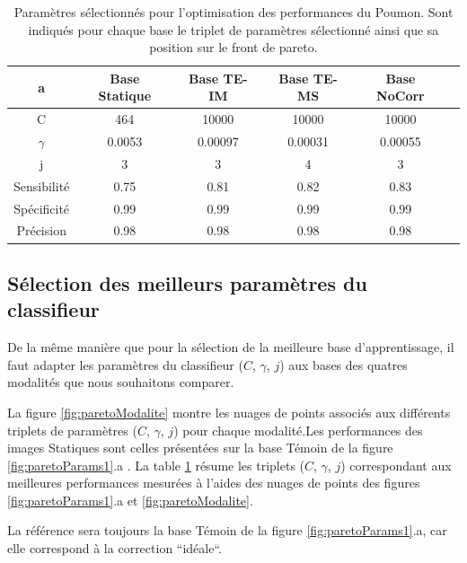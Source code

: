 \begin{table}[h!]
	\begin{center}
		\begin{tabular}{c| c c c c c}
  \hline
  a	& Base Statique	& Base TE-IM	& Base TE-MS	& Base NoCorr	\\
  \hline
 C 	& 464		& 10000		& 10000		& 10000		\\
\hline
$\gamma$& 0.0053	& 0.00097	& 0.00031	& 0.00055	\\
\hline
j	& 3		& 3		& 4		& 3		\\
\hline
\hline
Sensibilité& 0.75	& 0.81		& 0.82		& 0.83	\\
\hline
Spécificité& 0.99	& 0.99		& 0.99		& 0.99		\\
\hline
Précision& 0.98		& 0.98		& 0.98		& 0.98		\\
\hline
 		\end{tabular}

	\end{center}
\caption{Paramètres sélectionnés pour l'optimisation des performances du Poumon. Sont indiqués pour chaque base le triplet de paramètres sélectionné ainsi que sa position sur le front de pareto.}
\label{tab:paramsModPoumon}
\end{table}

\subsection{Sélection des meilleurs paramètres du classifieur}

De la même manière que pour la sélection de la meilleure base d'apprentissage, il faut adapter les paramètres du classifieur ($C$, $\gamma$, $j$) aux bases des quatres modalités que nous souhaitons comparer.

La figure \ref{fig:paretoModalite} montre les nuages de points associés aux différents triplets de paramètres ($C$, $\gamma$, $j$) pour chaque modalité.Les performances des images Statiques sont celles présentées sur la base Témoin de la figure \ref{fig:paretoParams1}.a . La table \ref{tab:paramsModPoumon} résume les triplets ($C$, $\gamma$, $j$) correspondant aux meilleures performances mesurées à l'aides des nuages de points des figures \ref{fig:paretoParams1}.a et \ref{fig:paretoModalite}.

 La référence sera toujours la base Témoin de la figure \ref{fig:paretoParams1}.a, car elle correspond à la correction ``idéale``.

